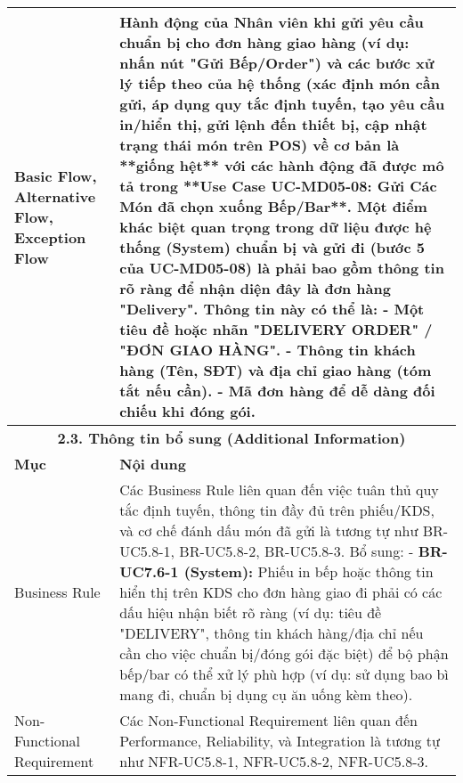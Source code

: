 \begin{longtable}{|m{4cm}|p{11cm}|}
Basic Flow, Alternative Flow, Exception Flow & Hành động của Nhân viên khi gửi yêu cầu chuẩn bị cho đơn hàng giao hàng (ví dụ: nhấn nút "Gửi Bếp/Order") và các bước xử lý tiếp theo của hệ thống (xác định món cần gửi, áp dụng quy tắc định tuyến, tạo yêu cầu in/hiển thị, gửi lệnh đến thiết bị, cập nhật trạng thái món trên POS) về cơ bản là **giống hệt** với các hành động đã được mô tả trong **Use Case UC-MD05-08: Gửi Các Món đã chọn xuống Bếp/Bar**. \newline Một điểm khác biệt quan trọng trong dữ liệu được hệ thống (System) chuẩn bị và gửi đi (bước 5 của UC-MD05-08) là phải bao gồm thông tin rõ ràng để nhận diện đây là đơn hàng "Delivery". Thông tin này có thể là: \newline    - Một tiêu đề hoặc nhãn "DELIVERY ORDER" / "ĐƠN GIAO HÀNG". \newline    - Thông tin khách hàng (Tên, SĐT) và địa chỉ giao hàng (tóm tắt nếu cần). \newline    - Mã đơn hàng để dễ dàng đối chiếu khi đóng gói. \\
\hline
\multicolumn{2}{|c|}{\textbf{2.3. Thông tin bổ sung (Additional Information)}} \\
\hline
\textbf{Mục} & \textbf{Nội dung} \\
\hline
Business Rule & Các Business Rule liên quan đến việc tuân thủ quy tắc định tuyến, thông tin đầy đủ trên phiếu/KDS, và cơ chế đánh dấu món đã gửi là tương tự như BR-UC5.8-1, BR-UC5.8-2, BR-UC5.8-3. Bổ sung: \newline - \textbf{BR-UC7.6-1 (System):} Phiếu in bếp hoặc thông tin hiển thị trên KDS cho đơn hàng giao đi phải có các dấu hiệu nhận biết rõ ràng (ví dụ: tiêu đề "DELIVERY", thông tin khách hàng/địa chỉ nếu cần cho việc chuẩn bị/đóng gói đặc biệt) để bộ phận bếp/bar có thể xử lý phù hợp (ví dụ: sử dụng bao bì mang đi, chuẩn bị dụng cụ ăn uống kèm theo). \\
\hline
Non-Functional Requirement & Các Non-Functional Requirement liên quan đến Performance, Reliability, và Integration là tương tự như NFR-UC5.8-1, NFR-UC5.8-2, NFR-UC5.8-3. \\
\hline
\end{longtable}

